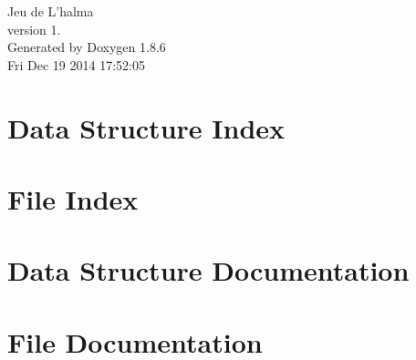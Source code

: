 \documentclass[twoside]{book}
\newcommand{\clearemptydoublepage}{%
  \newpage{\pagestyle{empty}\cleardoublepage}%
}
\begin{document}
\hypersetup{pageanchor=false}
\begin{titlepage}
\vspace*{7cm}
\begin{center}%
{\Large Jeu de L'halma \\[1ex]\large version 1. }\\
\vspace*{1cm}
{\large Generated by Doxygen 1.8.6}\\
\vspace*{0.5cm}
{\small Fri Dec 19 2014 17:52:05}\\
\end{center}
\end{titlepage}
\clearemptydoublepage
\tableofcontents
\clearemptydoublepage
{}
\hypersetup{pageanchor=true}

\chapter{Data Structure Index}

\chapter{File Index}

\chapter{Data Structure Documentation}
























\chapter{File Documentation}









































\newpage
{}
{}
\printindex
\end{document}

